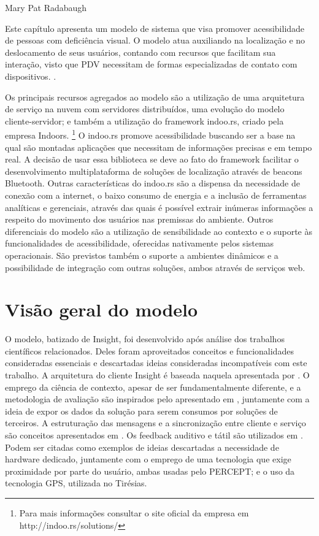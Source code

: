 \documentclass[english,brazilian]{UNISINOSmonografia}
\begin{document}

{Mary Pat Radabaugh}

Este capítulo apresenta um modelo de sistema que visa promover acessibilidade de pessoas com deficiência visual. O modelo atua auxiliando na localização e no deslocamento de seus usuários, contando com recursos que facilitam sua interação, visto que PDV necessitam de formas especializadas de contato com dispositivos. .

Os principais recursos agregados ao modelo são a utilização de uma arquitetura de serviço na nuvem com servidores distribuídos, uma evolução do modelo cliente-servidor; e também a utilização do framework indoo.rs, criado pela empresa Indoors. \footnote{Para mais informações consultar o site oficial da empresa em http://indoo.rs/solutions/} O indoo.rs promove acessibilidade buscando ser a base na qual são montadas aplicações que necessitam de informações precisas e em tempo real. A decisão de usar essa biblioteca se deve ao fato do framework facilitar o desenvolvimento multiplataforma de soluções de localização através de beacons Bluetooth. Outras características do indoo.rs são a dispensa da necessidade de conexão com a internet, o baixo consumo de energia e a inclusão de ferramentas analíticas e gerenciais, através das quais é possível extrair inúmeras informações a respeito do movimento dos usuários nas premissas do ambiente. Outros diferenciais do modelo são a utilização de sensibilidade ao contexto e o suporte às funcionalidades de acessibilidade, oferecidas nativamente pelos sistemas operacionais.
São previstos também o suporte a ambientes dinâmicos e a possibilidade de integração com outras soluções, ambos através de serviços web.

\section{Visão geral do modelo} 
O modelo, batizado de Insight, foi desenvolvido após análise dos trabalhos científicos relacionados. Deles foram aproveitados conceitos e funcionalidades consideradas essenciais e descartadas ideias consideradas incompatíveis com este trabalho. A arquitetura do cliente Insight é baseada naquela apresentada por . O emprego da ciência de contexto, apesar de ser fundamentalmente diferente, e a metodologia de avaliação são inspirados pelo apresentado em , juntamente com a ideia de expor os dados da solução para serem consumos por soluções de terceiros. A estruturação das mensagens e a sincronização entre cliente e serviço são conceitos apresentados em . Os feedback auditivo e tátil são utilizados em . Podem ser citadas como exemplos de ideias descartadas a necessidade de hardware dedicado, juntamente com o emprego de uma tecnologia que exige proximidade por parte do usuário, ambas usadas pelo PERCEPT; e o uso da tecnologia GPS, utilizada no Tirésias.
\end{document}
